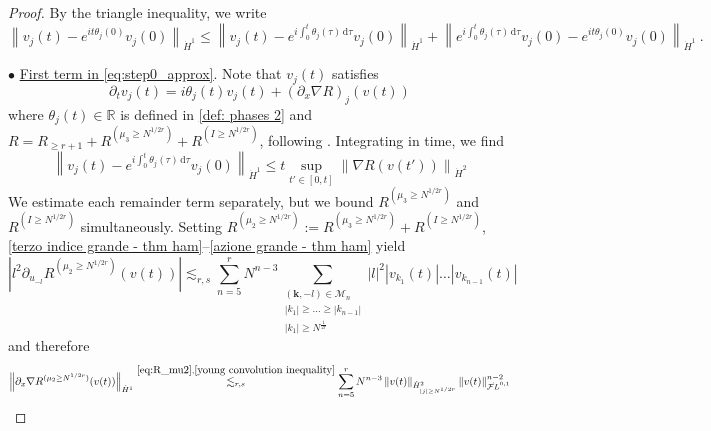 \documentclass[a4paper,10pt,reqno]{article}
\theoremstyle{definition}
\theoremstyle{plain}
\theoremstyle{plain}
\theoremstyle{definition}
\theoremstyle{plain}
\theoremstyle{plain}
\theoremstyle{plain}
\theoremstyle{definition}
\theoremstyle{definition}
\newcommand{\norm}[1]{\left\lVert #1 \right\rVert}
\def \R{\mathbb R}
\def \FL{\mathcal{F}L}
\def \M{\mathcal{M}}
\def \D{\mathcal{D}}
\def \k{\bm{k}}
\begin{document}
\begin{proof}
\medskip

 By the triangle inequality, we write
\begin{equation}\label{eq:step0_approx}
 \norm{v_j(t)-e^{i t \theta_j(0)}v_j(0)}_{\dot{H}^1} \leq \norm{v_j(t) - e^{i \int_0^t \theta_j(\tau) \, \mathrm{d} \tau}v_j(0)}_{\dot{H}^1} + \norm{e^{i \int_0^t \theta_j(\tau) \, \mathrm{d} \tau}v_j(0) - e^{i t \theta_j(0)}v_j(0)}_{\dot{H}^1} \ .
\end{equation}

\medskip

\noindent $\bullet$ \underline{First term in \eqref{eq:step0_approx}}. Note that $v_j(t)$ satisfies
\[
\partial_t v_j(t) = i \theta_j(t) v_j(t) + (\partial_x \nabla R)_j(v(t))
\]
where $\theta_j(t)\in\R$ is defined in \eqref{def: phases 2} and $R = R_{\ge r+1} + R^{(\mu_3 \ge N^{1/2r})} + R^{(I \ge N^{1/2r})}$, following . Integrating in time, we find
\begin{equation}\label{eq:step1_approx}
\norm{v_j(t) - e^{i \int_0^t \theta_j(\tau) \, \mathrm{d} \tau}v_j(0)}_{\dot{H}^1} \le t \sup_{t' \in [0,t]} \norm{\nabla R(v(t'))}_{\dot{H}^2}
\end{equation}
We estimate each remainder term separately, but we bound $R^{(\mu_3 \ge N^{1/2r})}$ and $R^{(I \ge N^{1/2r})}$ simultaneously. Setting
$R^{(\mu_2 \ge N^{1/2r})}:= R^{(\mu_3 \ge N^{1/2r})}+ R^{(I \ge N^{1/2r})}$, \eqref{terzo indice grande - thm ham}--\eqref{azione grande - thm ham} yield
\begin{equation}\label{eq:R_mu2}
\left \lvert l^2 \partial_{u_{-l}} R^{(\mu_2 \ge N^{1/2r})}(v(t)) \right \rvert %
\lesssim_{r,s} \sum_{n=5}^r N^{n-3} \sum_{ \substack{ (\k,-l) \in \M_n \\ |k_1| \ge \ldots \ge |k_{n-1}| \\ |k_1| \ge N^{\frac{1}{2r}} } } |l|^2 |v_{k_1}(t)| \ldots |v_{k_{n-1}}(t)|
\end{equation}
and therefore
\[
\begin{split}
\norm{\partial_x \nabla R^{(\mu_2 \ge N^{1/2r})}(v(t))}_{\dot{H}^1} &  \stackrel{\eqref{eq:R_mu2}, \eqref{young convolution inequality}}{\lesssim_{r,s}} \sum_{n=5}^r N^{n-3} \norm{v(t)}_{\dot{H}_{|j| \ge N^{1/2r}}^2} \norm{v(t)}_{\dot{\FL}^{0,1}}^{n-2}  \\

\end{split}\]
\end{proof}
\end{document}
